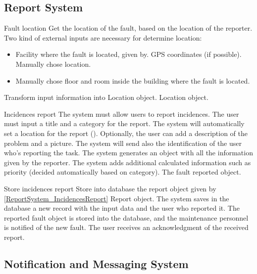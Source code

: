 \subsection{Report System}

\begin{requirement}{Fault location}
\label{reqFaultLocation}
\reqdesc Get the location of the fault, based on the location of the reporter.
\reqin Two kind of external inputs are necessary for determine location:
\begin{itemize}
\item Facility where the fault is located, given by.
\subitem GPS coordinates (if possible).
\subitem Manually chose location.
\item Manually chose floor and room inside the building where the fault is located.
\end{itemize}
\reqsteps Transform input information into Location object.
\reqout Location object.
\end{requirement}

\begin{requirement}{Incidences report}\label{ReportSystem_IncidencesReport}
\reqdesc The system must allow users to report incidences.
\reqin The user must input a title and a category for the report. The system will automatically set a location for the report (). Optionally, the user can add a description of the problem and a picture. The system will send also the identification of the user who's reporting the task.
\reqsteps The system generates an object with all the information given by the reporter. The system adds additional calculated information such as priority (decided automatically based on category).
\reqout The fault reported object.
\end{requirement}

\begin{requirement}{Store incidences report}
\reqdesc Store into database the report object given by \ref{ReportSystem_IncidencesReport}
\reqin Report object.
\reqdesc The system saves in the database a new record with the input data and the user who reported it.
\reqout The reported fault object is stored into the database, and the maintenance personnel is notified of the new fault. The user receives an acknowledgment of the received report.
\end{requirement}

\subsection{Notification and Messaging System}


